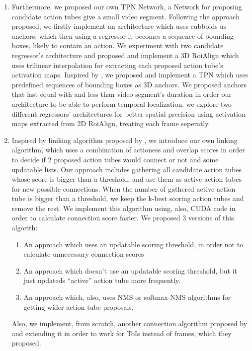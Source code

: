 \documentclass{report}
\begin{document}
\begin{enumerate}
\item Furthermore, we proposed our own TPN Network, a Network for proposing candidate action tubes give a small video segment.
  Following the approach \cite{DBLP:journals/corr/HouCS17} proposed, we firstly implement an architecture which uses
  cubboids as anchors, which then using a regressor it becomes a sequence of bounding boxes, likely to contain an action.
  We experiment with two candidate regressor's architecture and proposed and implement a 3D RoiAlign which uses trilinear
  interpolation for extracting each proposed action tube's activation maps. 
  Inspired by \cite{DBLP:journals/corr/abs-1712-09184}, we proposed and implement a TPN which uses predefined sequences of bounding
  boxes as 3D anchors. We proposed anchors that last equal with and less than video segment's duration in order our architecture to be able to
  perform temporal localization.  we explore two different regressors' architectures for better spatial precision using activation
  maps extracted from 2D RoiAlign, treating each frame seperatly.
\item Inspired by liniking algorithm proposed by \cite{DBLP:journals/corr/HouCS17}, we introduce our own linking algorithm, which
  uses a combination of actioness and overlap scores in order to decide if 2 proposed action tubes would connect or not and some updatable lists.
  Our approach includes gathering all candidate action tubes whose score is bigger than a threshold, and use them as active action tubes for
  new possible connections. When the number of gathered active action tube is bigger than a threshold, we keep the k-best scoring action tubes
  and remove the rest.  We implement this algorithm using, also, CUDA code in order to calculate connection score faster. We proposed 3 versions of this algorith:
  \begin{enumerate}
  \item An approach which uses an updatable scoring threshold, in order not to calculate unnecessary connection scores
  \item An approach which doesn't use an updatable scoring threshold, but it just updateds ``active'' action tube more frequently.
  \item An approach which, also, uses NMS or softmax-NMS algorithms for getting wider action tube proposals.
  \end{enumerate}
  Also, we implement, from scratch, another connection algorithm proposed by \cite{DBLP:journals/corr/abs-1903-00304} and extending it in order to work for ToIs instead of frames, which they proposed.

\end{enumerate}
\end{document}
